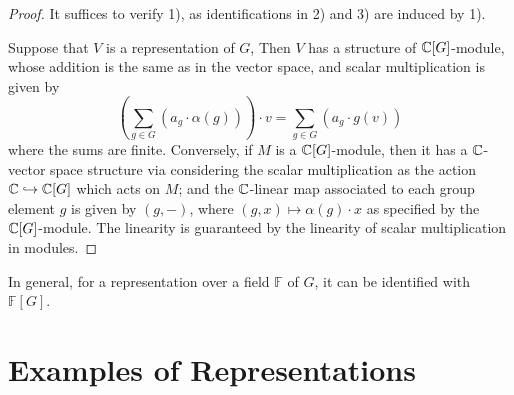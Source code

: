 \documentclass{article}
\begin{document}
\begin{proof}
    It suffices to verify 1), as identifications in 2) and 3) are induced by 1). 
    
    Suppose that $V$ is a representation of $G$, Then $V$ has a structure of $\mathbb{C}[G]$-module, whose addition is the same as in the vector space, and scalar multiplication is given by
    \[
        \left( \sum_{g \in G} (a_g \cdot \alpha(g)) \right) \cdot v = \sum_{g \in G} (a_g \cdot g(v))
    \]
    where the sums are finite. Conversely, if $M$ is a $\mathbb{C}[G]$-module, then it has a $\mathbb{C}$-vector space structure via considering the scalar multiplication as the action $\mathbb{C} \hookrightarrow \mathbb{C}[G]$ which acts on $M$; and the $\mathbb{C}$-linear map associated to each group element $g$ is given by $(g, -)$, where $(g, x) \mapsto \alpha(g) \cdot x$ as specified by the $\mathbb{C}[G]$-module. The linearity is guaranteed by the linearity of scalar multiplication in modules.
\end{proof}

\begin{remark}
    In general, for a representation over a field $\mathbb{F}$ of $G$, it can be identified with $\mathbb{F}[G]$.
\end{remark}

\section{Examples of Representations}
\end{document}
